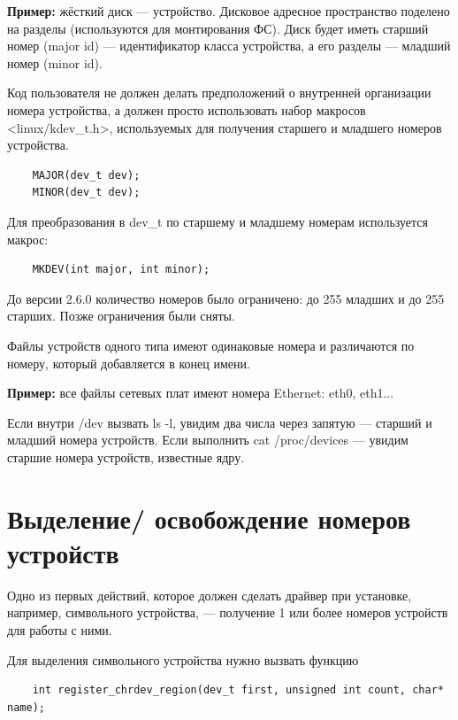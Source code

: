 \textbf{Пример:} жёсткий диск --- устройство. Дисковое адресное пространство поделено на разделы (используются для монтирования ФС). Диск будет иметь старший номер (major id) --- идентификатор класса устройства, а его разделы --- младший номер (minor id).  

Код пользователя не должен делать предположений о внутренней организации номера устройства, а должен просто использовать набор макросов \\ <linux/kdev\_t.h>, используемых для получения старшего и младшего номеров устройства.

\begin{lstlisting}
	MAJOR(dev_t dev);
	MINOR(dev_t dev);
\end{lstlisting}

Для преобразования в dev\_t по старшему и младшему номерам используется макрос:

\begin{lstlisting}
	MKDEV(int major, int minor);
\end{lstlisting}

До версии 2.6.0 количество номеров было ограничено: до 255 младших и до 255 старших. Позже ограничения были сняты.

Файлы устройств одного типа имеют одинаковые номера и различаются по номеру, который добавляется в конец имени. 

\textbf{Пример:} все файлы сетевых плат имеют номера Ethernet: eth0, eth1...

Если внутри /dev вызвать ls -l, увидим два числа через запятую --- старший и младший номера устройств. Если выполнить cat /proc/devices --- увидим старшие номера устройств, известные ядру.

\section{Выделение/ освобождение номеров \\ устройств}

Одно из первых действий, которое должен сделать драйвер при установке, например, символьного устройства, --- получение 1 или более номеров устройств для работы с ними. 

Для выделения символьного устройства нужно вызвать функцию

\begin{lstlisting}
	int register_chrdev_region(dev_t first, unsigned int count, char* name);
\end{lstlisting}

